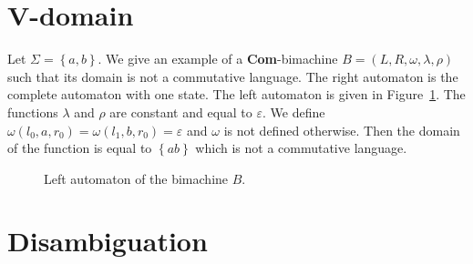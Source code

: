 \documentclass[12pt]{report}
\theoremstyle{definition}
\theoremstyle{remark}
\begin{document}
\section{V-domain}
\label{app-v-dom}
Let $\Sigma=\left\{a,b\right\}$.
We give an example of a \textbf{Com}-bimachine $B=(L,R,\omega,\lambda,\rho)$ such that its domain is not a commutative language.
The right automaton is the complete automaton with one state. The left automaton is given in Figure~\ref{v-bim}.
The functions $\lambda$ and $\rho$ are constant and equal to $\varepsilon$.
We define $\omega(l_0,a,r_0)=\omega(l_1,b,r_0)=\varepsilon$ and $\omega$ is not defined otherwise.
Then the domain of the function is equal to $\left\{ab\right\}$ which is not a commutative language.
\begin{figure}[t]
\centering

\caption{Left automaton of the bimachine $B$.}
\label{v-bim}
\end{figure}


\section{Disambiguation}
\end{document}
